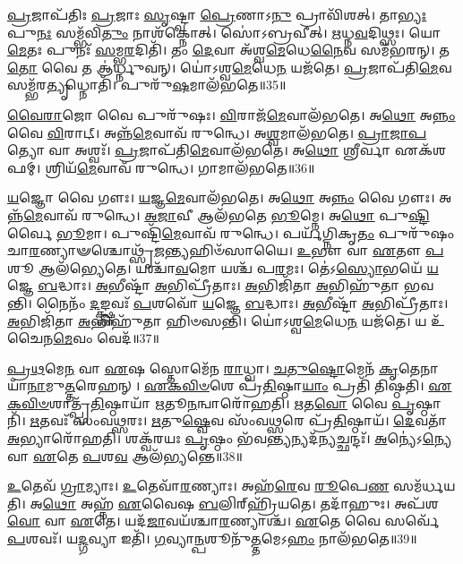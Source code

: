 \-\ul{𑌪𑍍𑌰}\-𑌜𑌾\-𑌪᳴𑌤𑌿𑌃 \ul{𑌪𑍍𑌰}\-𑌜𑌾𑌃 \ul{𑌸𑍃}\-𑌷𑍍𑌟𑍍𑌵𑌾 \ul{𑌪𑍍𑌰𑍇}\-𑌣𑌾𑌽\-\ul{𑌨𑍁} 𑌪𑍍𑌰𑌾𑌵𑌿᳴𑌶𑌤𑍍।
𑌤𑌾\-\ul{𑌭𑍍𑌯𑌃} 𑌪𑍁\-\ul{𑌨𑌃} 𑌸𑌮𑍍𑌭᳴𑌵𑌿\-\ul{𑌤𑍁𑌂} 𑌨𑌾𑌶᳴𑌕𑍍𑌨𑍋𑌤𑍍।
𑌸𑍋॑𑌽𑌬𑍍𑌰𑌵𑍀𑌤𑍍।
\-\ul{𑌋}\-𑌧𑍍𑌨\-\ul{𑌵}\-𑌦𑌿𑌥𑍍𑌸𑌃।
𑌯𑍋 \ul{𑌮𑍇}\-𑌤𑌃 𑌪𑍁𑌨𑌃᳴ \ul{𑌸}\-𑌮𑍍𑌭\-\ul{𑌰}\-𑌦𑌿𑌤𑌿᳴।
𑌤𑌂 \ul{𑌦𑍇}\-𑌵𑌾 𑌅᳴𑌶𑍍𑌵\-\ul{𑌮𑍇}\-𑌧𑍇\-\ul{𑌨𑍈}\-𑌵 𑌸𑌮᳴𑌭𑌰𑌨𑍍।
𑌤\-\ul{𑌤𑍋} 𑌵𑍈 𑌤 𑌆॑𑌰𑍍𑌧𑍍𑌨𑍁𑌵𑌨𑍍।
𑌯𑍋॑𑌽𑌶𑍍𑌵\-\ul{𑌮𑍇}\-𑌧𑍇\-\ul{𑌨} 𑌯𑌜᳴𑌤𑍇।
\-\ul{𑌪𑍍𑌰}\-𑌜𑌾𑌪᳴𑌤𑌿\-\ul{𑌮𑍇}\-𑌵 𑌸𑌮𑍍𑌭᳴𑌰\-\ul{𑌤𑍍𑌯𑍃}\-𑌧𑍍𑌨𑍋𑌤𑌿᳴।
𑌪𑍁𑌰𑍁᳴\-\ul{𑌷}\-𑌮𑌾𑌲᳴𑌭𑌤𑍇॥35॥

\-\ul{𑌵𑍈}\-\-\ul{𑌰𑌾}\-𑌜𑍋 𑌵𑍈 𑌪𑍁𑌰𑍁᳴𑌷𑌃।
\-\ul{𑌵𑌿}\-𑌰𑌾𑌜᳴\-\ul{𑌮𑍇}\-𑌵𑌾𑌲᳴𑌭𑌤𑍇।
𑌅\-\ul{𑌥𑍋} 𑌅\-\ul{𑌨𑍍𑌨𑌂} 𑌵𑍈 \ul{𑌵𑌿}\-𑌰𑌾𑌟𑍍।
𑌅𑌨𑍍𑌨᳴\-\ul{𑌮𑍇}\-𑌵𑌾𑌵᳴ 𑌰𑍁𑌨𑍍𑌧𑍇।
𑌅\-\ul{𑌶𑍍𑌵}\-𑌮𑌾𑌲᳴𑌭𑌤𑍇।
\-\ul{𑌪𑍍𑌰𑌾}\-\-\ul{𑌜𑌾}\-\-\ul{𑌪}\-𑌤𑍍𑌯𑍋 𑌵𑌾 𑌅𑌶𑍍𑌵𑌃᳴।
\-\ul{𑌪𑍍𑌰}\-𑌜𑌾𑌪᳴𑌤𑌿\-\ul{𑌮𑍇}\-𑌵𑌾𑌲᳴𑌭𑌤𑍇।
𑌅\-\ul{𑌥𑍋} 𑌶𑍍𑌰𑍀𑌰𑍍𑌵𑌾 𑌏𑌕᳴𑌶𑌫𑌮𑍍।
𑌶𑍍𑌰𑌿𑌯᳴\-\ul{𑌮𑍇}\-𑌵𑌾𑌵᳴ 𑌰𑍁𑌨𑍍𑌧𑍇।
𑌗𑌾𑌮𑌾𑌲᳴𑌭𑌤𑍇॥36॥

\-\ul{𑌯}\-𑌜𑍍𑌞𑍋 𑌵𑍈 𑌗𑍗𑌃।
\-\ul{𑌯}\-𑌜𑍍𑌞\-\ul{𑌮𑍇}\-𑌵𑌾𑌲᳴𑌭𑌤𑍇।
𑌅\-\ul{𑌥𑍋} 𑌅\-\ul{𑌨𑍍𑌨𑌂} 𑌵𑍈 𑌗𑍗𑌃।
𑌅𑌨𑍍𑌨᳴\-\ul{𑌮𑍇}\-𑌵𑌾𑌵᳴ 𑌰𑍁𑌨𑍍𑌧𑍇।
\-\ul{𑌅}\-\-\ul{𑌜𑌾}\-𑌵𑍀 𑌆𑌲᳴𑌭𑌤𑍇 \ul{𑌭𑍂}\-𑌮𑍍𑌨𑍇।
𑌅\-\ul{𑌥𑍋} 𑌪𑍁\-\ul{𑌷𑍍𑌟𑌿}\-𑌰𑍍𑌵𑍈 \ul{𑌭𑍂}\-𑌮𑌾।
𑌪𑍁𑌷𑍍𑌟𑌿᳴\-\ul{𑌮𑍇}\-𑌵𑌾𑌵᳴ 𑌰𑍁𑌨𑍍𑌧𑍇।
𑌪𑌰𑍍𑌯᳴𑌗𑍍𑌨𑌿𑌕𑍃\-\ul{𑌤𑌂} 𑌪𑍁𑌰𑍁᳴𑌷𑌂 𑌚𑌾\-\ul{𑌰}\-𑌣𑍍𑌯𑌾𑍟𑌶𑍍𑌚𑍋𑌥𑍍𑌸𑍃᳴\-\ul{𑌜}\-𑌨𑍍𑌤𑍍𑌯𑌹𑌿𑍞᳴𑌸𑌾𑌯𑍈।
\-\ul{𑌉}\-𑌭𑍗 𑌵𑌾 \ul{𑌏}\-𑌤𑍗 \ul{𑌪}\-𑌶𑍂 𑌆𑌲᳴𑌭𑍍𑌯𑍇𑌤𑍇।
𑌯𑌶𑍍𑌚𑌾᳴\-\ul{𑌵}\-𑌮𑍋 𑌯𑌶𑍍𑌚᳴ 𑌪\-\ul{𑌰}\-𑌮𑌃।
𑌤𑍇॑𑌽\-\ul{𑌸𑍍𑌯𑍋}\-𑌭𑌯𑍇᳴ \ul{𑌯}\-𑌜𑍍𑌞𑍇 \ul{𑌬}\-𑌦𑍍𑌧𑌾𑌃।
\-\ul{𑌅}\-𑌭𑍀𑌷𑍍𑌟𑌾᳴ \ul{𑌅}\-𑌭𑌿𑌪𑍍𑌰𑍀᳴𑌤𑌾𑌃।
\-\ul{𑌅}\-𑌭𑌿𑌜𑌿᳴𑌤𑌾 \ul{𑌅}\-𑌭𑌿𑌹𑍁᳴𑌤𑌾 𑌭𑌵𑌨𑍍𑌤𑌿।
𑌨𑍈𑌨𑌂᳴ \ul{𑌦}\-𑌙𑍍𑌕𑍍𑌷𑍍𑌣𑌵𑌃᳴ \ul{𑌪}\-𑌶𑌵𑍋᳴ \ul{𑌯}\-𑌜𑍍𑌞𑍇 \ul{𑌬}\-𑌦𑍍𑌧𑌾𑌃।
\-\ul{𑌅}\-𑌭𑍀𑌷𑍍𑌟𑌾᳴ \ul{𑌅}\-𑌭𑌿𑌪𑍍𑌰𑍀᳴𑌤𑌾𑌃।
\-\ul{𑌅}\-𑌭𑌿𑌜𑌿᳴𑌤𑌾 \ul{𑌅}\-𑌭𑌿𑌹𑍁᳴𑌤𑌾 𑌹𑌿𑍞𑌸𑌨𑍍𑌤𑌿।
𑌯𑍋॑𑌽𑌶𑍍𑌵\-\ul{𑌮𑍇}\-𑌧𑍇\-\ul{𑌨} 𑌯𑌜᳴𑌤𑍇।
𑌯 𑌉᳴ 𑌚𑍈𑌨\-\ul{𑌮𑍇}\-𑌵𑌂 𑌵𑍇𑌦᳴॥37॥\anuvakamend[\-\ul{𑌲}\-\-\ul{𑌭}\-\-\ul{𑌤𑍇} 𑌗𑌾𑌮𑌾𑌲᳴𑌭𑌤𑍇 𑌪\-\ul{𑌰}\-𑌮𑍋॑\-𑌽𑌷𑍍𑌟𑍗 𑌚᳴]

\-\ul{𑌪𑍍𑌰}\-\-\ul{𑌥}\-𑌮𑍇\-\ul{𑌨} 𑌵𑌾 \ul{𑌏}\-𑌷 𑌸𑍍𑌤𑍋𑌮𑍇᳴𑌨 \ul{𑌰𑌾}\-𑌧𑍍𑌵𑌾।
\-\ul{𑌚}\-\-\ul{𑌤𑍁}\-\-\ul{𑌷𑍍𑌟𑍋}\-𑌮𑍇𑌨᳴ \ul{𑌕𑍃}\-𑌤𑍇𑌨𑌾𑌯𑌾᳴\-\ul{𑌨𑌾}\-𑌮𑍁\-\ul{𑌤𑍍𑌤}\-𑌰𑍇\-𑌹𑌨𑍍।
\-\ul{𑌏}\-\-\ul{𑌕}\-\-\ul{𑌵𑌿}\-\-\ul{𑍞}\-𑌶𑍇 𑌪𑍍𑌰᳴\-\ul{𑌤𑌿}\-𑌷𑍍𑌠𑌾\-\ul{𑌯𑌾𑌂} 𑌪𑍍𑌰𑌤𑌿᳴ 𑌤𑌿𑌷𑍍𑌠𑌤𑌿।
\-\ul{𑌏}\-\-\ul{𑌕}\-\-\ul{𑌵𑌿}\-\-\ul{𑍞}\-𑌶𑌾𑌤𑍍𑌪𑍍𑌰᳴\-\ul{𑌤𑌿}\-𑌷𑍍𑌠𑌾𑌯𑌾᳴ \ul{𑌋}\-𑌤𑍂\-\ul{𑌨}\-𑌨𑍍𑌵𑌾𑌰𑍋᳴𑌹𑌤𑌿।
\-\ul{𑌋}\-𑌤\-\ul{𑌵𑍋} 𑌵𑍈 \ul{𑌪𑍃}\-𑌷𑍍𑌠𑌾𑌨𑌿᳴।
\-\ul{𑌋}\-𑌤𑌵𑌃᳴ 𑌸𑌂𑌵\-\ul{𑌥𑍍𑌸}\-𑌰𑌃।
\-\ul{𑌋}\-𑌤𑍁\-\ul{𑌷𑍍𑌵𑍇}\-𑌵 𑌸𑌂᳴𑌵\-\ul{𑌥𑍍𑌸}\-𑌰𑍇 𑌪𑍍𑌰᳴\-\ul{𑌤𑌿}\-𑌷𑍍𑌠𑌾𑌯᳴।
\-\ul{𑌦𑍇}\-𑌵𑌤𑌾᳴ \ul{𑌅}\-𑌭𑍍𑌯𑌾𑌰𑍋᳴𑌹𑌤𑌿।
𑌶𑌕𑍍𑌵᳴𑌰𑌯𑌃 \ul{𑌪𑍃}\-𑌷𑍍𑌠𑌂 𑌭᳴𑌵\-\ul{𑌨𑍍𑌤𑍍𑌯}\-𑌨𑍍𑌯𑌦᳴\-\ul{𑌨𑍍𑌯}\-𑌚𑍍𑌛𑌨𑍍𑌦𑌃᳴।
\-\ul{𑌅}\-𑌨𑍍𑌯𑍇॑\-𑌽\-\ul{𑌨𑍍𑌯𑍇} 𑌵𑌾 \ul{𑌏}\-𑌤𑍇 \ul{𑌪}\-𑌶\-\ul{𑌵} 𑌆𑌲᳴𑌭𑍍𑌯𑌨𑍍𑌤𑍇॥38॥

\-\ul{𑌉}\-𑌤𑍇𑌵᳴ \ul{𑌗𑍍𑌰𑌾}\-𑌮𑍍𑌯𑌾𑌃।
\-\ul{𑌉}\-𑌤𑍇𑌵𑌾᳴\-\ul{𑌰}\-𑌣𑍍𑌯𑌾𑌃।
𑌅𑌹᳴\-\ul{𑌰𑍇}\-𑌵 \ul{𑌰𑍂}\-𑌪𑍇\-\ul{𑌣} 𑌸𑌮᳴𑌰𑍍𑌧𑌯𑌤𑌿।
𑌅\-\ul{𑌥𑍋} 𑌅𑌹𑍍𑌨᳴ \ul{𑌏}\-𑌵𑍈𑌷 \ul{𑌬}\-𑌲𑌿𑌰𑍍‌\mbox{}𑌹𑍍𑌰𑌿᳴𑌯𑌤𑍇।
𑌤𑌦𑌾᳴𑌹𑍁𑌃।
𑌅𑌪᳴𑌶\-\ul{𑌵𑍋} 𑌵𑌾 \ul{𑌏}\-𑌤𑍇।
𑌯𑌦᳴\-\ul{𑌜𑌾}\-𑌵𑌯᳴𑌶𑍍𑌚𑌾\-\ul{𑌰}\-𑌣𑍍𑌯𑌾𑌶𑍍𑌚᳴।
\-\ul{𑌏}\-𑌤𑍇 𑌵𑍈 𑌸𑌰𑍍𑌵𑍇᳴ \ul{𑌪}\-𑌶𑌵𑌃᳴।
𑌯\-\ul{𑌦𑍍𑌗}\-𑌵𑍍𑌯𑌾 𑌇𑌤𑌿᳴।
\-\ul{𑌗}\-𑌵𑍍𑌯𑌾\-\ul{𑌨𑍍𑌪}\-𑌶𑍂𑌨𑍁᳴\-\ul{𑌤𑍍𑌤}\-𑌮𑍇𑌽\-\ul{𑌹𑌂} 𑌨𑌾𑌲᳴𑌭𑌤𑍇॥39॥


